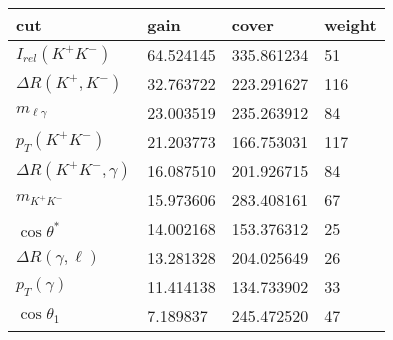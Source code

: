\begin{tabular}{llll}
\toprule
cut &       gain &       cover &  weight \\
\midrule
$I_{rel}(K^{+}K^{-})$ &  64.524145 &  335.861234 &      51 \\
$\Delta R(K^{+},K^{-})$ &  32.763722 &  223.291627 &     116 \\
$m_{\ell\gamma}$ &  23.003519 &  235.263912 &      84 \\
$p_{T}(K^{+}K^{-})$ &  21.203773 &  166.753031 &     117 \\
$\Delta R(K^{+}K^{-}, \gamma)$ &  16.087510 &  201.926715 &      84 \\
$m_{K^{+}K^{-}}$ &  15.973606 &  283.408161 &      67 \\
$\cos\theta^{*}$ &  14.002168 &  153.376312 &      25 \\
$\Delta R(\gamma, \ell)$ &  13.281328 &  204.025649 &      26 \\
$p_{T}(\gamma)$ &  11.414138 &  134.733902 &      33 \\
$\cos\theta_{1}$ &   7.189837 &  245.472520 &      47 \\
\bottomrule
\end{tabular}
